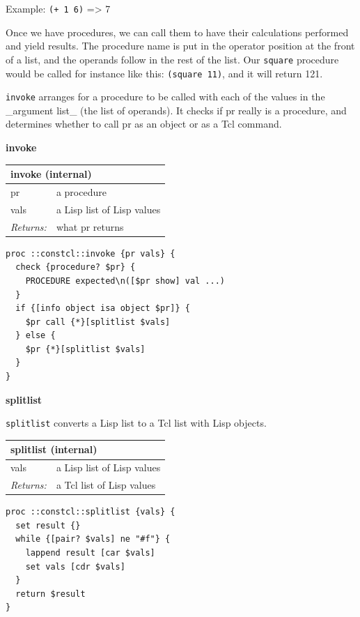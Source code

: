 \documentclass[twoside,9pt]{report}
\begin{document}
Example: \texttt{(+ 1 6)} => 7


Once we have procedures, we can call them to have their calculations performed and yield results. The procedure name is put in the operator position at the front of a list, and the operands follow in the rest of the list. Our \texttt{square} procedure would be called for instance like this: \texttt{(square 11)}, and it will return 121.


\texttt{invoke} arranges for a procedure to be called with each of the values in the \_argument list\_ (the list of operands). It checks if pr really is a procedure, and determines whether to call pr as an object or as a Tcl command.


\textbf{invoke}

\begin{tabular}{ |l l| }
\hline
\multicolumn{2}{|l|}{invoke (internal)} \\
\hline
pr & a procedure \\
vals & a Lisp list of Lisp values \\
\textit{Returns:} & what pr returns \\
\hline
\end{tabular}

\noindent\makebox[\linewidth]{\rule{\linewidth}{0.4pt}}
\begin{lstlisting}
proc ::constcl::invoke {pr vals} {
  check {procedure? $pr} {
    PROCEDURE expected\n([$pr show] val ...)
  }
  if {[info object isa object $pr]} {
    $pr call {*}[splitlist $vals]
  } else {
    $pr {*}[splitlist $vals]
  }
}
\end{lstlisting}
\noindent\makebox[\linewidth]{\rule{\linewidth}{0.4pt}}

\textbf{splitlist}


\texttt{splitlist} converts a Lisp list to a Tcl list with Lisp objects.

\begin{tabular}{ |l l| }
\hline
\multicolumn{2}{|l|}{splitlist (internal)} \\
\hline
vals & a Lisp list of Lisp values \\
\textit{Returns:} & a Tcl list of Lisp values \\
\hline
\end{tabular}

\noindent\makebox[\linewidth]{\rule{\linewidth}{0.4pt}}
\begin{lstlisting}
proc ::constcl::splitlist {vals} {
  set result {}
  while {[pair? $vals] ne "#f"} {
    lappend result [car $vals]
    set vals [cdr $vals]
  }
  return $result
}
\end{lstlisting}
\noindent\makebox[\linewidth]{\rule{\linewidth}{0.4pt}}
\end{document}
